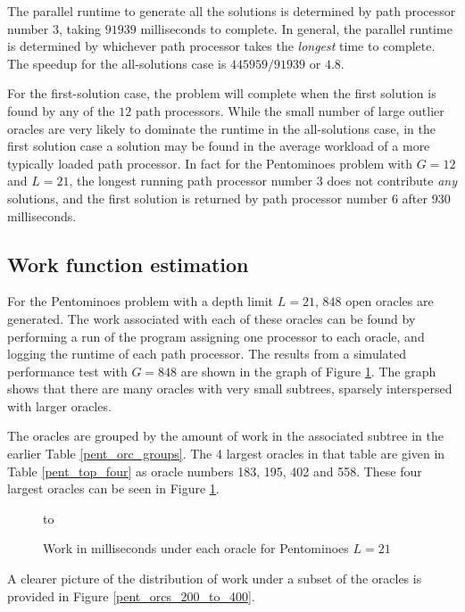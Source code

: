 The parallel runtime to generate all the solutions is determined by path processor number $3$,
taking $91939$ milliseconds to complete.  In general, the parallel runtime is determined by 
whichever path processor takes the \textit{longest} time to complete.  The speedup for the 
all-solutions case is $445959/91939$ or $4.8$.

For the first-solution case, the problem will complete when the first solution is found by
any of the $12$ path processors.  While the small number of large outlier oracles
 are very likely to
dominate the runtime in the all-solutions case, in the first solution case a solution may be
found in the average workload of a more typically loaded path processor.  In fact for the
Pentominoes problem with $G=12$ and $L=21$, the longest running
path processor number 3 does not contribute
\textit{any} solutions, and the first solution is returned by path processor number $6$ 
after $930$ milliseconds.

\subsection{Work function estimation}
\label{work_estimation}

For the Pentominoes problem with a depth limit $L=21$, $848$ open oracles are generated.
The work associated with each of these oracles 
can be found by performing a run of the program assigning one processor to
each oracle, and logging the runtime of each path processor.  The results from a
simulated performance test with $G=848$ are shown in the graph of Figure
\ref{pent_orcs}. The graph shows that there are many oracles with very small subtrees,
sparsely interspersed with larger oracles.

The oracles are grouped by the amount of work in the associated
subtree in the earlier Table \ref{pent_orc_groups}. The 4 largest oracles in that
table are given in Table \ref{pent_top_four} as oracle numbers 183, 195, 402 and 558.
These four largest oracles can be seen in Figure \ref{pent_orcs}.

\begin{figure}[htbp]
\vspace{5mm} \hbox to 
\caption{Work in milliseconds under each oracle for Pentominoes $L=21$}
\vspace{5mm}
\label{pent_orcs}
\end{figure}

A clearer picture of the distribution of work under a subset of the oracles is provided in
Figure \ref{pent_orcs_200_to_400}.

